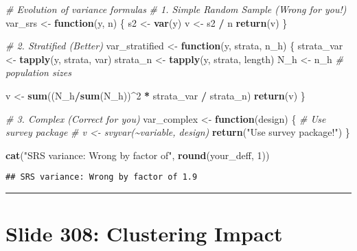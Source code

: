 \documentclass[
]{article}
\newenvironment{Shaded}{\begin{snugshade}}{\end{snugshade}}
\newcommand{\CommentTok}[1]{\textcolor[rgb]{0.56,0.35,0.01}{\textit{#1}}}
\newcommand{\ControlFlowTok}[1]{\textcolor[rgb]{0.13,0.29,0.53}{\textbf{#1}}}
\newcommand{\DecValTok}[1]{\textcolor[rgb]{0.00,0.00,0.81}{#1}}
\newcommand{\FunctionTok}[1]{\textcolor[rgb]{0.13,0.29,0.53}{\textbf{#1}}}
\newcommand{\NormalTok}[1]{#1}
\newcommand{\OtherTok}[1]{\textcolor[rgb]{0.56,0.35,0.01}{#1}}
\newcommand{\SpecialCharTok}[1]{\textcolor[rgb]{0.81,0.36,0.00}{\textbf{#1}}}
\newcommand{\StringTok}[1]{\textcolor[rgb]{0.31,0.60,0.02}{#1}}
\begin{document}
\begin{Shaded}
\begin{Highlighting}[]
\CommentTok{\# Evolution of variance formulas}
\CommentTok{\# 1. Simple Random Sample (Wrong for you!)}
\NormalTok{var\_srs }\OtherTok{\textless{}{-}} \ControlFlowTok{function}\NormalTok{(y, n) \{}
\NormalTok{  s2 }\OtherTok{\textless{}{-}} \FunctionTok{var}\NormalTok{(y)}
\NormalTok{  v }\OtherTok{\textless{}{-}}\NormalTok{ s2 }\SpecialCharTok{/}\NormalTok{ n}
  \FunctionTok{return}\NormalTok{(v)}
\NormalTok{\}}

\CommentTok{\# 2. Stratified (Better)}
\NormalTok{var\_stratified }\OtherTok{\textless{}{-}} \ControlFlowTok{function}\NormalTok{(y, strata, n\_h) \{}
\NormalTok{  strata\_var }\OtherTok{\textless{}{-}} \FunctionTok{tapply}\NormalTok{(y, strata, var)}
\NormalTok{  strata\_n }\OtherTok{\textless{}{-}} \FunctionTok{tapply}\NormalTok{(y, strata, length)}
\NormalTok{  N\_h }\OtherTok{\textless{}{-}}\NormalTok{ n\_h  }\CommentTok{\# population sizes}
  
\NormalTok{  v }\OtherTok{\textless{}{-}} \FunctionTok{sum}\NormalTok{((N\_h}\SpecialCharTok{/}\FunctionTok{sum}\NormalTok{(N\_h))}\SpecialCharTok{\^{}}\DecValTok{2} \SpecialCharTok{*}\NormalTok{ strata\_var }\SpecialCharTok{/}\NormalTok{ strata\_n)}
  \FunctionTok{return}\NormalTok{(v)}
\NormalTok{\}}

\CommentTok{\# 3. Complex (Correct for you)}
\NormalTok{var\_complex }\OtherTok{\textless{}{-}} \ControlFlowTok{function}\NormalTok{(design) \{}
  \CommentTok{\# Use survey package}
  \CommentTok{\# v \textless{}{-} svyvar(\textasciitilde{}variable, design)}
  \FunctionTok{return}\NormalTok{(}\StringTok{"Use survey package!"}\NormalTok{)}
\NormalTok{\}}

\FunctionTok{cat}\NormalTok{(}\StringTok{"SRS variance: Wrong by factor of"}\NormalTok{, }\FunctionTok{round}\NormalTok{(your\_deff, }\DecValTok{1}\NormalTok{))}
\end{Highlighting}
\end{Shaded}

\begin{verbatim}
## SRS variance: Wrong by factor of 1.9
\end{verbatim}

\begin{center}\rule{0.5\linewidth}{0.5pt}\end{center}

\section{Slide 308: Clustering
Impact}\label{slide-308-clustering-impact}
\end{document}

